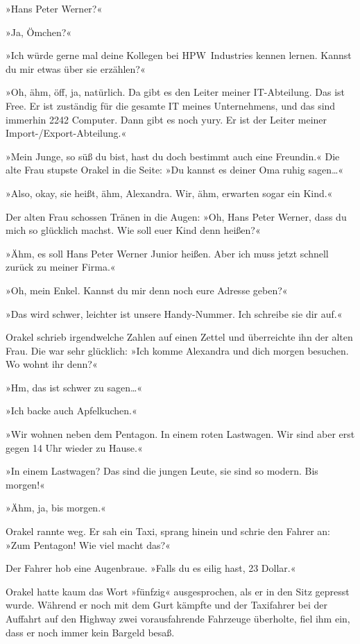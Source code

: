 »Hans Peter Werner?«

»Ja, Ömchen?«

»Ich würde gerne mal deine Kollegen bei HPW~Industries kennen lernen. Kannst du mir etwas über sie erzählen?«

»Oh, ähm, öff, ja, natürlich. Da gibt es den Leiter meiner IT-Abteilung. Das ist Free. Er ist zuständig für die gesamte IT meines Unternehmens, und das sind immerhin 2242 Computer. Dann gibt es noch yury. Er ist der Leiter meiner Import-/Export-Abteilung.«

»Mein Junge, so süß du bist, hast du doch bestimmt auch eine Freundin.« Die alte Frau stupste Orakel in die Seite: »Du kannst es deiner Oma ruhig sagen…«

»Also, okay, sie heißt, ähm, Alexandra. Wir, ähm, erwarten sogar ein Kind.«

Der alten Frau schossen Tränen in die Augen: »Oh, Hans Peter Werner, dass du mich so glücklich machst. Wie soll euer Kind denn heißen?«

»Ähm, es soll Hans Peter Werner Junior heißen. Aber ich muss jetzt schnell zurück zu meiner Firma.«

»Oh, mein Enkel. Kannst du mir denn noch eure Adresse geben?«

»Das wird schwer, leichter ist unsere Handy-Nummer. Ich schreibe sie dir auf.«

Orakel schrieb irgendwelche Zahlen auf einen Zettel und überreichte ihn der alten Frau. Die war sehr glücklich: »Ich komme Alexandra und dich morgen besuchen. Wo wohnt ihr denn?«

»Hm, das ist schwer zu sagen…«

»Ich backe auch Apfelkuchen.«

»Wir wohnen neben dem Pentagon. In einem roten Lastwagen. Wir sind aber erst gegen 14 Uhr wieder zu Hause.«

»In einem Lastwagen? Das sind die jungen Leute, sie sind so modern. Bis morgen!«

»Ähm, ja, bis morgen.«

Orakel rannte weg. Er sah ein Taxi, sprang hinein und schrie den Fahrer an: »Zum Pentagon! Wie viel macht das?«

Der Fahrer hob eine Augenbraue. »Falls du es eilig hast, 23 Dollar.«

Orakel hatte kaum das Wort »fünfzig« ausgesprochen, als er in den Sitz gepresst wurde. Während er noch mit dem Gurt kämpfte und der Taxifahrer bei der Auffahrt auf den Highway zwei vorausfahrende Fahrzeuge überholte, fiel ihm ein, dass er noch immer kein Bargeld besaß.

